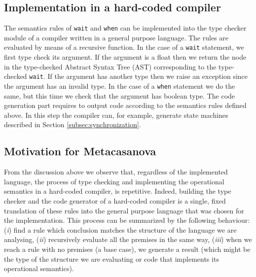 \subsection{Implementation in a hard-coded compiler}
The semantics rules of \texttt{wait} and \texttt{when} can be implemented into the type checker module of a compiler written in a general purpose language. The rules are evaluated by means of a recursive function. In the case of a \texttt{wait} statement, we first type check its argument. If the argument is a float then we return the node in the type-checked Abstract Syntax Tree (AST) corresponding to the type-checked \texttt{wait}. If the argument has another type then we raise an exception since the argument has an invalid type. In the case of a \texttt{when} statement we do the same, but this time we check that the argument has boolean type.
The code generation part requires to output code according to the semantics rules defined above. In this step the compiler can, for example, generate state machines described in Section \ref{subsec:synchronization}.

\subsection{Motivation for Metacasanova}

From the discussion above we observe that, regardless of the implemented language, the process of type checking and implementing the operational semantics in a hard-coded compiler, is repetitive. Indeed, building the type checker and the code generator of a hard-coded compiler is a single, fixed translation of these rules into the general purpose language that was chosen for the implementation. This process can be summarized by the following behaviour: (\textit{i}) find a rule which conclusion matches the structure of the language we are analysing, (\textit{ii}) recursively evaluate all the premises in the same way, (\textit{iii}) when we reach a rule with no premises (a base case), we generate a result (which might be the type of the structure we are evaluating or code that implements its operational semantics).

